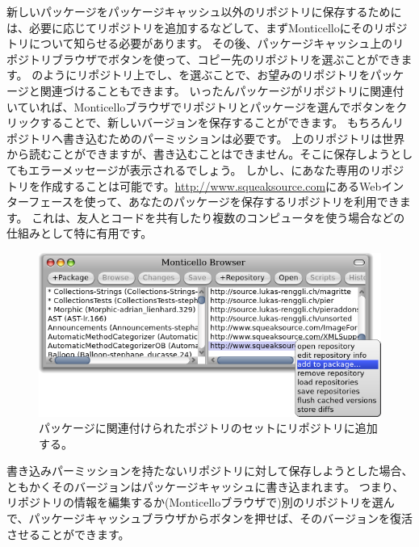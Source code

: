 \documentclass[a4paper,10pt,twoside]{book}
\begin{document}
新しいパッケージをパッケージキャッシュ以外のリポジトリに保存するためには、必要に応じてリポジトリを追加するなどして、まずMonticelloにそのリポジトリについて知らせる必要があります。
その後、パッケージキャッシュ上のリポジトリブラウザでボタンを使って、コピー先のリポジトリを選ぶことができます。
のようにリポジトリ上で\actclick し、を選ぶことで、お望みのリポジトリをパッケージと関連づけることもできます。
いったんパッケージがリポジトリに関連付いていれば、Monticelloブラウザでリポジトリとパッケージを選んでボタンをクリックすることで、新しいバージョンを保存することができます。
もちろんリポジトリへ書き込むためのパーミッションは必要です。
\emphind{\sqsrc}上のリポジトリは世界から読むことができますが、書き込むことはできません。そこに保存しようとしてもエラーメッセージが表示されるでしょう。
しかし、\sqsrc にあなた専用のリポジトリを作成することは可能です。\url{http://www.squeaksource.com}にあるWebインターフェースを使って、あなたのパッケージを保存するリポジトリを利用できます。
これは、友人とコードを共有したり複数のコンピュータを使う場合などの仕組みとして特に有用です。

\begin{figure}[tbp]
\begin{center}
\includegraphics[width=\textwidth]{MCaddToPackage}
\end{center}
\caption{パッケージに関連付けられたポジトリのセットにリポジトリに追加する。}
\end{figure}

書き込みパーミッションを持たないリポジトリに対して保存しようとした場合、ともかくそのバージョンはパッケージキャッシュに書き込まれます。
つまり、リポジトリの情報を編集するか(Monticelloブラウザで\actclick )別のリポジトリを選んで、パッケージキャッシュブラウザからボタンを押せば、そのバージョンを復活させることができます。
\end{document}
